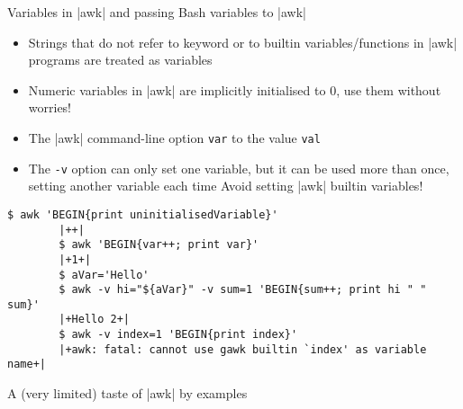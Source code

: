 \begin{frame}[fragile]{Variables in \bash|awk| and passing Bash variables to \bash|awk|}
    \vspace{-3mm}
    \begin{itemize}
        \item Strings that do not refer to keyword or to builtin variables/functions in \bash|awk| programs are treated as variables
        \item \alert{Numeric variables in \bash|awk| are implicitly initialised to 0, use them without worries!}
        \item The \bash|awk| command-line option  \texttt{var} to the value \texttt{val} 
        \item The \texttt{-v} option can only set one variable, but it can be used more than once, setting another variable each time
              \alert{Avoid setting \bash|awk| builtin variables!}
    \end{itemize}
    \begin{lstlisting}[style=MyBash, xleftmargin=2mm, xrightmargin=2mm]
        $ awk 'BEGIN{print uninitialisedVariable}'
        |++|
        $ awk 'BEGIN{var++; print var}'
        |+1+|
        $ aVar='Hello'
        $ awk -v hi="${aVar}" -v sum=1 'BEGIN{sum++; print hi " " sum}'
        |+Hello 2+|
        $ awk -v index=1 'BEGIN{print index}'
        |+awk: fatal: cannot use gawk builtin `index' as variable name+|
    \end{lstlisting}
\end{frame}
\begin{frame}{A (very limited) taste of \bash|awk| by examples}
    
\end{frame}

